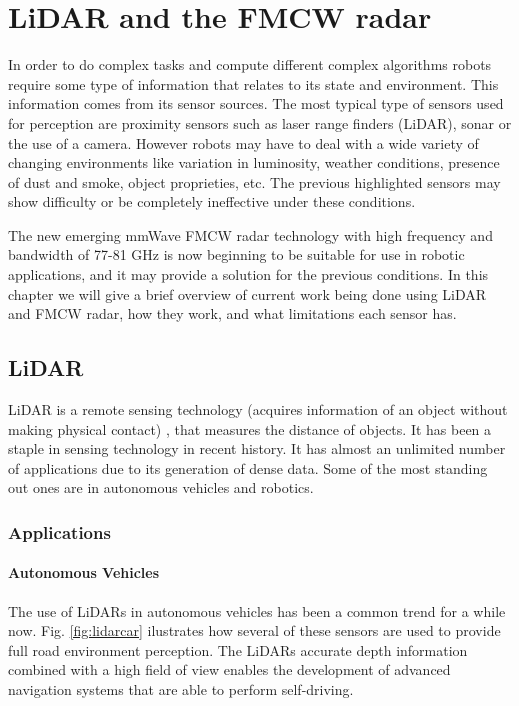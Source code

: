\chapter{LiDAR and the FMCW radar} \label{ch:Concepts}

In order to do complex tasks and compute different complex algorithms robots require some type of information that relates to its state and environment. This information comes from its sensor sources.
The most typical type of sensors used for perception are proximity sensors such as laser range finders (\ac{LiDAR}), sonar or the use of a camera. However robots may have to deal with a wide variety of changing environments like variation in luminosity, weather conditions, presence of dust and smoke, object proprieties, etc. The previous highlighted sensors may show difficulty or be completely ineffective under these conditions.

The new emerging \ac{mmWave} \ac{FMCW} radar technology with high frequency and bandwidth of 77-81 GHz is now beginning to be suitable for use in robotic applications, and it may provide a solution for the previous conditions. In this chapter we will give a brief overview of current work being done using \ac{LiDAR} and \ac{FMCW} \ac{radar}, how they work, and what limitations each sensor has.

\section{LiDAR}
\ac{LiDAR} is a remote sensing technology (acquires information of an object without making physical contact) , that measures the distance of objects. It has been a staple in sensing technology in recent history. It has almost an  unlimited  number of applications \cite{lidar100uses} due to its generation of dense data. Some of the most standing out ones are in autonomous vehicles and robotics.
\subsection{Applications}

\subsubsection{Autonomous Vehicles}
The use of \ac{LiDAR}s in autonomous vehicles has been a common trend for a while now. Fig. \ref{fig:lidarcar} ilustrates how several of these sensors are used to provide full road environment perception. The \ac{LiDAR}s accurate depth information combined with a high field of view enables the development of advanced navigation systems that are able to perform self-driving.
 
